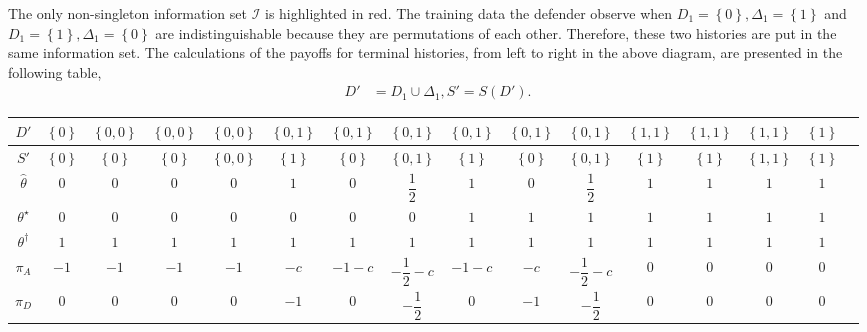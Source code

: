 \documentclass{article}
\begin{document}
The only non-singleton information set $\mathcal{I}$ is highlighted in red. The training data the defender observe when $D_{1} = \left\{0\right\}, \Delta_{1} = \left\{1\right\}$ and $D_{1} = \left\{1\right\}, \Delta_{1} = \left\{0\right\}$ are indistinguishable because they are permutations of each other. Therefore, these two histories are put in the same information set.
\newline \newline
The calculations of the payoffs for terminal histories, from left to right in the above diagram, are presented in the following table,
\begin{align*}
D' &= D_{1} \cup \Delta_{1}, S' = S\left(D'\right) .
\end{align*}
\begin{center} \begin{tabular}{|c|c|c|c|c|c|c|c|c|c|c|c|c|c|c|c|}
\hline
 $D'$ &$\left\{0\right\}$ &$\left\{0, 0\right\}$ &$\left\{0, 0\right\}$ &$\left\{0, 0\right\}$ &$\left\{0, 1\right\}$ &$\left\{0, 1\right\}$ &$\left\{0, 1\right\}$ &$\left\{0, 1\right\}$ &$\left\{0, 1\right\}$ &$\left\{0, 1\right\}$ &$\left\{1, 1\right\}$ &$\left\{1, 1\right\}$ &$\left\{1, 1\right\}$ &$\left\{1\right\}$\\ \hline
$S'$ &$\left\{0\right\}$ &$\left\{0\right\}$ &$\left\{0\right\}$ &$\left\{0, 0\right\}$ &$\left\{1\right\}$ &$\left\{0\right\}$ &$\left\{0, 1\right\}$ &$\left\{1\right\}$ &$\left\{0\right\}$ &$\left\{0, 1\right\}$ &$\left\{1\right\}$ &$\left\{1\right\}$ &$\left\{1, 1\right\}$ &$\left\{1\right\}$\\ \hline
$\hat{\theta}$ &$0$ &$0$ &$0$ &$0$ &$1$ &$0$ &$\dfrac{1}{2}$ &$1$ &$0$ &$\dfrac{1}{2}$ &$1$ &$1$ &$1$ &$1$\\ \hline
$\theta^\star $ &$0$ &$0$ &$0$ &$0$ &$0$ &$0$ &$0$ &$1$ &$1$ &$1$ &$1$ &$1$ &$1$ &$1$\\ \hline
$\theta^{\dagger}$ &$1$ &$1$ &$1$ &$1$ &$1$ &$1$ &$1$ &$1$ &$1$ &$1$ &$1$ &$1$ &$1$ &$1$\\ \hline
$\pi_{A}$ &$-1$ &$-1$ &$-1$ &$-1$ &$-c $ &$-1 - c $ &$- \dfrac{1}{2} - c $ &$-1 - c $ &$-c $ &$- \dfrac{1}{2} - c $ &$0$ &$0$ &$0$ &$0$\\ \hline
$\pi_{D}$ &$0$ &$0$ &$0$ &$0$ &$-1$ &$0$ &$- \dfrac{1}{2}$ &$0$ &$-1$ &$- \dfrac{1}{2}$ &$0$ &$0$ &$0$ &$0$\\ \hline
\end{tabular} \end{center}
\end{document}
